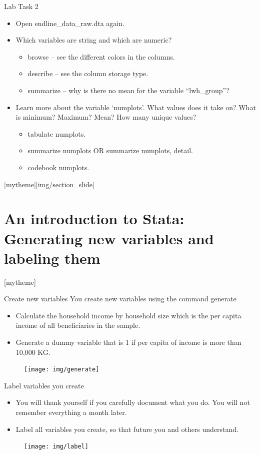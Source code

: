 \documentclass[aspectratio=169]{beamer}
\newcommand{\sectionpic}[2]{
	\setbeamertemplate{section page}[mytheme][#2]
	\section{#1}
	\setbeamertemplate{section page}[mytheme]
}
\begin{document}
\begin{frame}{Lab Task 2}
\begin{itemize}
	\item Open endline\_data\_raw.dta again.
	\item Which variables are string and which are numeric?	
		\begin{itemize}
			\item browse – see the different colors in the columns.		
			\item describe – see the column storage type.
			\item summarize – why is there no mean for the variable  “lwh\_group”?		
	\end{itemize}
	\item Learn more about the variable ‘numplots’. What values does it take on? What is minimum? Maximum? Mean? How many unique values?
		\begin{itemize}
			\item tabulate numplots.
			\item summarize numplots OR summarize numplots, detail.
			\item codebook numplots.
		\end{itemize}
\end{itemize}
\end{frame}

\sectionpic{An introduction to Stata: \newline Generating new variables and labeling them}{img/section_slide}

\begin{frame}[fragile]{Create new variables}
You create new variables using the command generate 

\begin{multicols}{2}	
	\begin{itemize}
		\item Calculate the household income by household size which is the per capita income of all beneficiaries in the sample.
		\item Generate a dummy variable that is 1 if per capita of income is more than 10,000 KG.
	\end{itemize}
	\begin{figure}
		\centering
		\texttt{[image: img/generate]}
	\end{figure}
\end{multicols}
\end{frame}

\begin{frame}[fragile]{Label variables you create}
\begin{itemize}
	\item You will thank yourself if you carefully document what you do. You will not remember everything a month later.
	\item Label all variables you create, so that future you and others understand.
\end{itemize}
\begin{figure}
	\centering
	\texttt{[image: img/label]}
\end{figure}
\end{frame}
\end{document}
